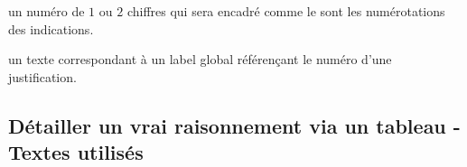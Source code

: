 \documentclass[12pt,a4paper]{article}
\begin{document}
\IDarg{} un numéro de $1$ ou $2$ chiffres qui sera encadré comme le sont les numérotations des indications.


\separation



\IDarg{} un texte correspondant à un label global référençant le numéro d'une justification.


\subsection{Détailler un \og vrai \fg{} raisonnement via un tableau - Textes utilisés}

     \hfill {}


   \hfill {}

   \hfill {}

\extraspace

   \hfill {} 

    \hfill {}

    \hfill {}

\extraspace

\end{document}
